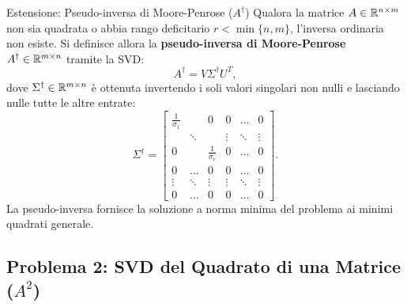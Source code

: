 \begin{noteblock}{Estensione: Pseudo-inversa di Moore-Penrose ($A^\dagger$)}
Qualora la matrice $A \in \mathbb{R}^{n \times m}$ non sia quadrata o abbia rango deficitario $r < \min\{n, m\}$, l'inversa ordinaria non esiste. Si definisce allora la \textbf{pseudo-inversa di Moore-Penrose} $A^\dagger \in \mathbb{R}^{m \times n}$ tramite la SVD:
\begin{equation}
    A^\dagger = V \Sigma^\dagger U^T,
\end{equation}
dove $\Sigma^\dagger \in \mathbb{R}^{m \times n}$ \`e ottenuta invertendo i soli valori singolari non nulli e lasciando nulle tutte le altre entrate:
\begin{equation}
    \Sigma^\dagger = \begin{bmatrix}
        \frac{1}{\sigma_1} & & 0 & 0 & \dots & 0 \\
        & \ddots & & \vdots & \ddots & \vdots \\
        0 & & \frac{1}{\sigma_r} & 0 & \dots & 0 \\
        0 & \dots & 0 & 0 & \dots & 0 \\
        \vdots & \ddots & \vdots & \vdots & \ddots & \vdots \\
        0 & \dots & 0 & 0 & \dots & 0
    \end{bmatrix}.
\end{equation}
La pseudo-inversa fornisce la soluzione a norma minima del problema ai minimi quadrati generale.
\end{noteblock}

\subsection{Problema 2: SVD del Quadrato di una Matrice (\texorpdfstring{$A^2$}{A\textasciicircum 2})}

